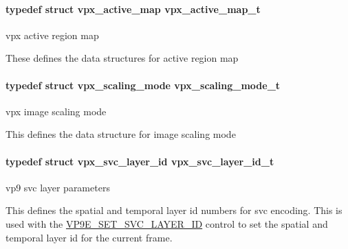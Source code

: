 \paragraph[{\texorpdfstring{vpx\+\_\+active\+\_\+map\+\_\+t}{vpx_active_map_t}}]{\setlength{\rightskip}{0pt plus 5cm}typedef struct {\bf vpx\+\_\+active\+\_\+map}  {\bf vpx\+\_\+active\+\_\+map\+\_\+t}}\hypertarget{group__vp8__encoder_ga7b48f7962f5061979f0f8ece6fb1cba8}{}\label{group__vp8__encoder_ga7b48f7962f5061979f0f8ece6fb1cba8}


vpx active region map 

These defines the data structures for active region map 
\paragraph[{\texorpdfstring{vpx\+\_\+scaling\+\_\+mode\+\_\+t}{vpx_scaling_mode_t}}]{\setlength{\rightskip}{0pt plus 5cm}typedef struct {\bf vpx\+\_\+scaling\+\_\+mode}  {\bf vpx\+\_\+scaling\+\_\+mode\+\_\+t}}\hypertarget{group__vp8__encoder_ga9600359ed9096cd96c621d9cf6c8df38}{}\label{group__vp8__encoder_ga9600359ed9096cd96c621d9cf6c8df38}


vpx image scaling mode 

This defines the data structure for image scaling mode 
\paragraph[{\texorpdfstring{vpx\+\_\+svc\+\_\+layer\+\_\+id\+\_\+t}{vpx_svc_layer_id_t}}]{\setlength{\rightskip}{0pt plus 5cm}typedef struct {\bf vpx\+\_\+svc\+\_\+layer\+\_\+id}  {\bf vpx\+\_\+svc\+\_\+layer\+\_\+id\+\_\+t}}\hypertarget{group__vp8__encoder_gaba42cb92c1895ae9f7214484c5488cd5}{}\label{group__vp8__encoder_gaba42cb92c1895ae9f7214484c5488cd5}


vp9 svc layer parameters 

This defines the spatial and temporal layer id numbers for svc encoding. This is used with the \hyperlink{group__vp8__encoder_gga6deae3d561c838952552c3d3756322eca090ad9dcb1f2eea2af60f4737c5bf514}{V\+P9\+E\+\_\+\+S\+E\+T\+\_\+\+S\+V\+C\+\_\+\+L\+A\+Y\+E\+R\+\_\+\+ID} control to set the spatial and temporal layer id for the current frame. 
